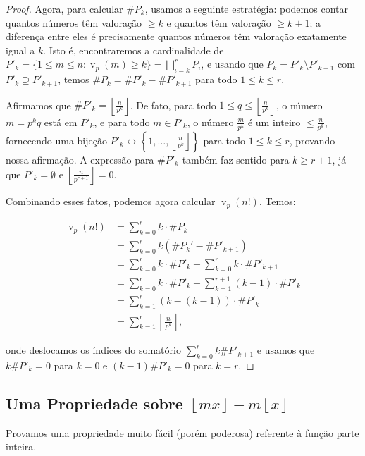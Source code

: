 \documentclass[11pt]{article}
\theoremstyle{remark}
\newcommand{\floor}[1]{\left\lfloor #1 \right\rfloor}
\newcommand{\vs}{\vspace{10px}}
\DeclareMathOperator{\val}{v}
\begin{document}
\begin{proof}
    Agora, para calcular $\#P_k$, usamos a seguinte estratégia: podemos contar quantos números têm valoração $\ge k$ e quantos têm valoração $\ge k+1$; a diferença entre eles é precisamente quantos números têm valoração exatamente igual a $k$. Isto é, encontraremos a cardinalidade de $P'_k = \{1\le m\le n: \val_p(m)\ge k\}= \bigsqcup\limits_{i=k}^rP_i$, e usando que $P_k= P'_k\setminus P'_{k+1}$ com $P'_k\supseteq P'_{k+1}$, temos $\#P_k = \#P'_k - \#P'_{k+1}$ para todo $1\le k\le r$.
    

    Afirmamos que $\#P'_k = \left \lfloor \frac{n}{p^k}\right \rfloor$. De fato, para todo $1\le q\le \left \lfloor \frac{n}{p^k}\right \rfloor$, o número $m= p^k q$ está em $P'_k$, e para todo $m\in P'_k$, o número $\frac{m}{p^k}$ é um inteiro $\le \frac{n}{p^k}$, fornecendo uma bijeção $P'_k \leftrightarrow \left\{1,\ldots, \left \lfloor \frac{n}{p^k}\right \rfloor\right\}$ para todo $1\le k\le r$, provando nossa afirmação. A expressão para $\#P'_k$ também faz sentido para $k\ge r+1$, já que $P'_k=\emptyset$ e $\floor{\frac{n}{p^{r+1}}}=0$.

    \vs
    
    Combinando esses fatos, podemos agora calcular $\val_p(n!)$. Temos:

    \begin{align*}
        \val_p(n!) &= \sum\limits_{k=0}^r k\cdot \#P_k\\
        &= \sum\limits_{k=0}^rk\left( \#P_k'- \#P'_{k+1}\right)\\
        &= \sum\limits_{k=0}^r k\cdot \#P'_k - \sum\limits_{k=0}^r k\cdot \#P'_{k+1}\\
        &= \sum\limits_{k=0}^r k\cdot \#P'_k - \sum\limits_{k=1}^{r+1} (k-1)\cdot \#P'_{k}\\
        &= \sum_{k=1}^r (k-(k-1))\cdot \#P'_k\\
        &= \sum_{k=1}^r \left \lfloor \frac{n}{p^k} \right \rfloor,
    \end{align*}

    onde deslocamos os índices do somatório $\sum\limits_{k=0}^r k\#P'_{k+1}$ e usamos que $k\#P'_k=0$ para $k = 0$ e $(k-1)\#P'_k = 0$ para $k =r$.
\end{proof}

\vs
\subsection{Uma Propriedade sobre $\floor{mx}-m\floor{x}$}

Provamos uma propriedade muito fácil (porém poderosa) referente à função parte inteira.
\vs
\end{document}
